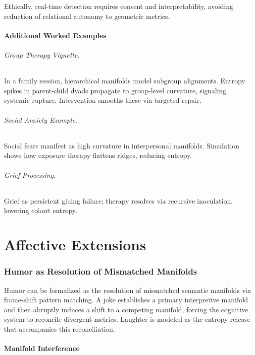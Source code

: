 \documentclass{article}
\theoremstyle{definition}
\begin{document}
Ethically, real-time detection requires consent and interpretability, avoiding reduction of relational autonomy to geometric metrics.

\subsection{Additional Worked Examples}

\paragraph{Group Therapy Vignette.}
In a family session, hierarchical manifolds model subgroup alignments. Entropy spikes in parent-child dyads propagate to group-level curvature, signaling systemic rupture. Intervention smooths these via targeted repair.

\paragraph{Social Anxiety Example.}
Social fears manifest as high curvature in interpersonal manifolds. Simulation shows how exposure therapy flattens ridges, reducing entropy.

\paragraph{Grief Processing.}
Grief as persistent gluing failure; therapy resolves via recursive inoculation, lowering cohort entropy.

\part{Affective Extensions}

\section{Humor as Resolution of Mismatched Manifolds}

Humor can be formalized as the resolution of mismatched semantic manifolds via frame-shift pattern matching. 
A joke establishes a primary interpretive manifold and then abruptly induces a shift to a competing manifold, 
forcing the cognitive system to reconcile divergent metrics. Laughter is modeled as the entropy release 
that accompanies this reconciliation.

\subsection{Manifold Interference}
\end{document}
